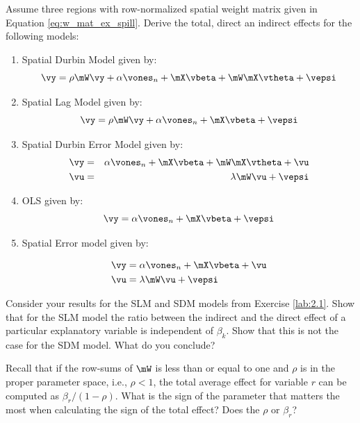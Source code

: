 \documentclass[english,12pt]{book}\usepackage[]{graphicx}\usepackage[]{xcolor}
\begin{document}
\begin{exercises}

    \exercise Assume three regions with row-normalized spatial weight matrix given in Equation \eqref{eq:w_mat_ex_spill}. Derive the total, direct an indirect effects for the following models:
        \begin{enumerate}
            \item Spatial Durbin Model given by:
		\begin{equation}
			\vy = \rho \mW \vy + \alpha \vones_n + \mX \vbeta + \mW \mX \vtheta + \vepsi
		\end{equation}
            \item Spatial Lag Model given by:
		\begin{equation}
			\vy = \rho \mW \vy + \alpha \vones_n + \mX\vbeta + \vepsi
		\end{equation}
		   \item Spatial Durbin Error Model given by:
		\begin{eqnarray}
			\vy &=& \alpha \vones_n + \mX\vbeta + \mW\mX\vtheta + \vu \\
			\vu &=& \lambda \mW\vu + \vepsi
		\end{eqnarray}
		\item OLS given by:
		\begin{equation}
			\vy = \alpha \vones_n + \mX\vbeta + \vepsi
		\end{equation}
		\item Spatial Error model given by:
		
		\begin{equation}
			\begin{aligned}
				\vy &= \alpha \vones_n + \mX\vbeta + \vu \\
				\vu &= \lambda \mW\vu + \vepsi
			\end{aligned}
		\end{equation} 
        \end{enumerate}

    \exercise Consider your results for the SLM and SDM models from Exercise  \ref{lab:2.1}. Show that for the SLM model the ratio between the indirect and the direct effect of a particular explanatory variable is independent of $\beta_k$. Show that this is not the case for the SDM model. What do you conclude?
    
    \exercise  Recall that if the row-sums of $\mW$ is less than or equal to one and $\rho$ is in the proper parameter space, i.e., $\rho <1$, the total average effect for variable $r$ can be computed as $\beta_r / (1 - \rho)$. What is the sign of the parameter that matters the most when calculating the sign of the total effect? Does the $\rho$ or $\beta_r$?

\end{exercises}
\end{document}
